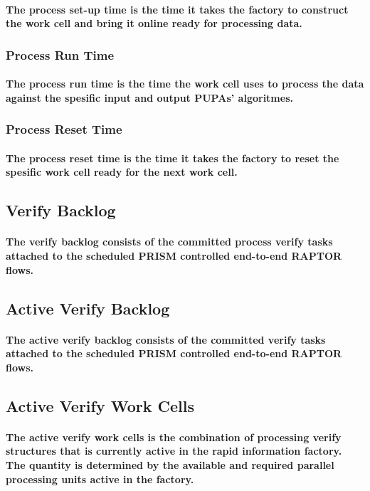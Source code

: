 \documentclass{acm_proc_article-sp}
\begin{document}
\paragraph{The process set-up time is the time it takes the factory to construct the work cell and bring it online ready for processing data.}
\subsubsection{\textbf{Process Run Time}}
\paragraph{The process run time is the time the work cell uses to process the data against the spesific input and output PUPAs' algoritmes.}
\subsubsection{\textbf{Process Reset Time}}
\paragraph{The process reset time is the time it takes the factory to reset the spesific work cell ready for the next work cell.}
\subsection{Verify Backlog}
\paragraph{The verify backlog consists of the committed process verify tasks attached to the scheduled PRISM controlled end-to-end RAPTOR flows.}
\subsection{Active Verify Backlog}
\paragraph{The active verify backlog consists of the committed verify tasks attached to the scheduled PRISM controlled end-to-end RAPTOR flows.}
\subsection{Active Verify Work Cells}
\paragraph{The active verify work cells is the combination of processing verify structures that is currently active in the rapid information factory. The quantity is determined by the available and required parallel processing units active in the factory.}
\end{document}

